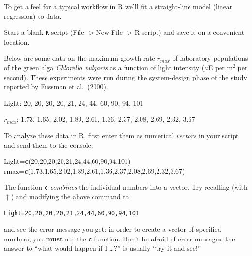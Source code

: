 \documentclass[11pt,]{article}
\newenvironment{Shaded}{\begin{snugshade}}{\end{snugshade}}
\newcommand{\DecValTok}[1]{\textcolor[rgb]{0.00,0.00,0.81}{#1}}
\newcommand{\FloatTok}[1]{\textcolor[rgb]{0.00,0.00,0.81}{#1}}
\newcommand{\KeywordTok}[1]{\textcolor[rgb]{0.13,0.29,0.53}{\textbf{#1}}}
\newcommand{\NormalTok}[1]{#1}
\begin{document}
To get a feel for a typical workflow in R we'll fit a straight-line model (linear regression) to data.

Start a blank \texttt{R} script (File -\textgreater{} New File -\textgreater{} R script) and save it on a convenient location.

Below are some data on the maximum growth rate \(r_{max}\) of laboratory populations of the green alga \emph{Chlorella vulgaris} as a function of light intensity (\(\mu\)E per m\(^2\) per second). These experiments were run during the system-design phase of the study reported by Fussman et al.~(2000).

Light: 20, 20, 20, 20, 21, 24, 44, 60, 90, 94, 101

\(r_{max}\): 1.73, 1.65, 2.02, 1.89, 2.61, 1.36, 2.37, 2.08, 2.69, 2.32, 3.67

To analyze these data in R, first enter them as numerical \emph{vectors} in your script and send them to the console:

\begin{Shaded}
\begin{Highlighting}[]
\NormalTok{Light=}\KeywordTok{c}\NormalTok{(}\DecValTok{20}\NormalTok{,}\DecValTok{20}\NormalTok{,}\DecValTok{20}\NormalTok{,}\DecValTok{20}\NormalTok{,}\DecValTok{21}\NormalTok{,}\DecValTok{24}\NormalTok{,}\DecValTok{44}\NormalTok{,}\DecValTok{60}\NormalTok{,}\DecValTok{90}\NormalTok{,}\DecValTok{94}\NormalTok{,}\DecValTok{101}\NormalTok{)}
\NormalTok{rmax=}\KeywordTok{c}\NormalTok{(}\FloatTok{1.73}\NormalTok{,}\FloatTok{1.65}\NormalTok{,}\FloatTok{2.02}\NormalTok{,}\FloatTok{1.89}\NormalTok{,}\FloatTok{2.61}\NormalTok{,}\FloatTok{1.36}\NormalTok{,}\FloatTok{2.37}\NormalTok{,}\FloatTok{2.08}\NormalTok{,}\FloatTok{2.69}\NormalTok{,}\FloatTok{2.32}\NormalTok{,}\FloatTok{3.67}\NormalTok{)}
\end{Highlighting}
\end{Shaded}

The function \texttt{c} \emph{combines} the individual numbers into a vector. Try recalling (with \(\uparrow\)) and modifying the above command to

\begin{verbatim}
Light=20,20,20,20,21,24,44,60,90,94,101
\end{verbatim}

and see the error message you get: in order to create a vector of specified numbers, you \textbf{must} use the \texttt{c} function. Don't be afraid of error messages: the answer to ``what would happen if I \ldots{}?'' is usually ``try it and see!''
\end{document}
